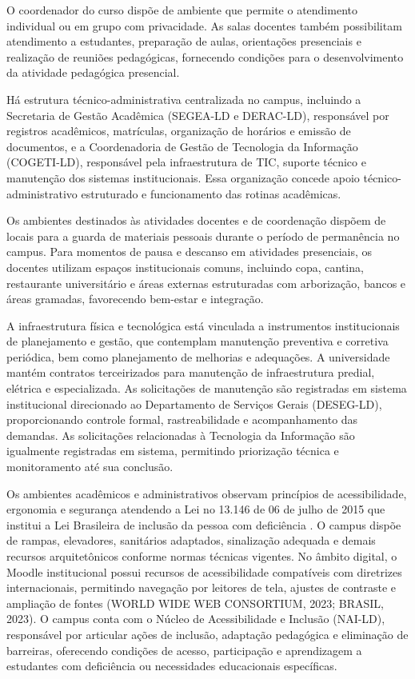 O coordenador do curso dispõe de ambiente que permite o atendimento individual ou em grupo com privacidade. As salas docentes também possibilitam atendimento a estudantes, preparação de aulas, orientações presenciais e realização de reuniões pedagógicas, fornecendo condições para o desenvolvimento da atividade pedagógica presencial.

Há estrutura técnico-administrativa centralizada no campus, incluindo a Secretaria de Gestão Acadêmica (SEGEA-LD e  DERAC-LD), responsável por registros acadêmicos, matrículas, organização de horários e emissão de documentos, e a Coordenadoria de Gestão de Tecnologia da Informação (COGETI-LD), responsável pela infraestrutura de TIC, suporte técnico e manutenção dos sistemas institucionais. Essa organização concede apoio técnico-administrativo estruturado e funcionamento das rotinas acadêmicas.

Os ambientes destinados às atividades docentes e de coordenação dispõem de locais para a guarda de materiais pessoais durante o período de permanência no campus. Para momentos de pausa e descanso em atividades presenciais, os docentes utilizam espaços institucionais comuns, incluindo copa, cantina, restaurante universitário e áreas externas estruturadas com arborização, bancos e áreas gramadas, favorecendo bem-estar e integração.

A infraestrutura física e tecnológica está vinculada a instrumentos institucionais de planejamento e gestão, que contemplam manutenção preventiva e corretiva periódica, bem como planejamento de melhorias e adequações. A universidade mantém contratos terceirizados para manutenção de infraestrutura predial, elétrica e especializada. As solicitações de manutenção são registradas em sistema institucional direcionado ao Departamento de Serviços Gerais (DESEG-LD), proporcionando controle formal, rastreabilidade e acompanhamento das demandas. As solicitações relacionadas à Tecnologia da Informação são igualmente registradas em sistema, permitindo priorização técnica e monitoramento até sua conclusão.

Os ambientes acadêmicos e administrativos observam princípios de acessibilidade, ergonomia e segurança atendendo a Lei no 13.146 de 06 de julho de 2015 que institui a Lei Brasileira de inclusão da pessoa com deficiência \cite{Brasil_2015_Deficiencia}. O campus dispõe de rampas, elevadores, sanitários adaptados, sinalização adequada e demais recursos arquitetônicos conforme normas técnicas vigentes. No âmbito digital, o Moodle institucional possui recursos de acessibilidade compatíveis com diretrizes internacionais, permitindo navegação por leitores de tela, ajustes de contraste e ampliação de fontes (WORLD WIDE WEB CONSORTIUM, 2023; BRASIL, 2023). O campus conta com o Núcleo de Acessibilidade e Inclusão (NAI-LD), responsável por articular ações de inclusão, adaptação pedagógica e eliminação de barreiras, oferecendo condições de acesso, participação e aprendizagem a estudantes com deficiência ou necessidades educacionais específicas.

